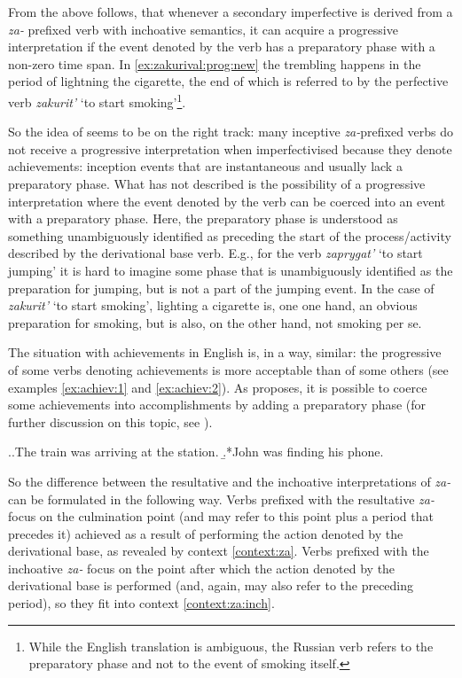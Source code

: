 From the above follows, that whenever a secondary imperfective is derived from a \textit{za-} prefixed verb with inchoative semantics, it can acquire a progressive interpretation if the event denoted by the verb has a preparatory phase with a non-zero time span. In \ref{ex:zakurival:prog:new} the trembling happens in the period of lightning the cigarette, the end of which is referred to by the perfective verb \textit{zakurit'} `to start smoking'\footnote{While the English translation is ambiguous, the Russian verb refers to the preparatory phase and not to the event of smoking itself.}. 

So the idea of \citet{Braginsky:08} seems to be on the right track: many inceptive \textit{za-}prefixed verbs do not receive a progressive interpretation when imperfectivised because they denote achievements: inception events that are instantaneous and usually lack a preparatory phase. What \citet{Braginsky:08} has not described is the possibility of a progressive interpretation where the event denoted by the verb can be coerced into an event with a preparatory phase. Here, the preparatory phase is understood as something unambiguously identified as preceding the start of the process/activity described by the derivational base verb. E.g., for the verb \textit{zaprygat'} `to start jumping' it is hard to imagine some phase that is unambiguously identified as the preparation for jumping, but is not a part of the jumping event. In the case of \textit{zakurit'} `to start smoking', lighting a cigarette is, one one hand, an obvious preparation for smoking, but is also, on the other hand, not smoking per se. 

The situation with achievements in English is, in a way, similar: the progressive of some verbs denoting achievements is more acceptable than of some others (see examples \ref{ex:achiev:1} and \ref{ex:achiev:2}). As \citet{Rothstein:04} proposes, it is possible to coerce some achievements into accomplishments by adding a preparatory phase (for further discussion on this topic, see \citealt{Gyarmathy:15}).

\ex.\a.\label{ex:achiev:1}The train was arriving at the station.
\b.*John was finding his phone.\label{ex:achiev:2}

So the difference between the resultative and the inchoative interpretations of \textit{za-} can be formulated in the following way. Verbs prefixed with the resultative \textit{za-} focus on the culmination point (and may refer to this point plus a period that precedes it) achieved as a result of performing the action denoted by the derivational base, as revealed by context \ref{context:za}. Verbs prefixed with the inchoative \textit{za-} focus on the point after which the action denoted by the derivational base is performed (and, again, may also refer to the preceding period), so they fit into context \ref{context:za:inch}.

